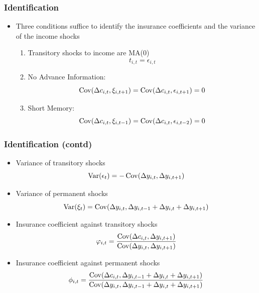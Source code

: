 \begin{frame}
	\frametitle{Identification}
	\begin{itemize}
		\item Three conditions suffice to identify the insurance coefficients and the variance of the income shocks
		\begin{enumerate}
			\item Transitory shocks to income are MA(0)
				\begin{equation}
					t_{i,t} = \epsilon_{i,t} \nonumber
				\end{equation}
			\item No Advance Information: 
				\begin{equation}
\operatorname{Cov}(\Delta c_{i,t}, \xi_{i,t+1}) = \operatorname{Cov}(\Delta c_{i,t}, \epsilon_{i,t+1}) = 0 \nonumber
				\end{equation}
			\item Short Memory: 
				\begin{equation}
\operatorname{Cov}(\Delta c_{i,t}, \xi_{i,t-1}) = \operatorname{Cov}(\Delta c_{i,t}, \epsilon_{i,t-2}) = 0 \nonumber
				\end{equation}
		\end{enumerate}
	\end{itemize}
\end{frame}

\begin{frame}
	\frametitle{Identification (contd)}
		\begin{itemize}
			\item Variance of transitory shocks
				\begin{equation}
					\operatorname{Var}(\epsilon_{t}) = -\operatorname{Cov}(\Delta y_{i,t}, \Delta y_{i,t+1}) \nonumber
				\end{equation}
			\item Variance of permanent shocks
				\begin{equation}
					\operatorname{Var}(\xi_{t} ) = \operatorname{Cov}(\Delta y_{i,t}, \Delta y_{i,t-1} + \Delta y_{i,t} + \Delta y_{i,t+1}) \nonumber
				\end{equation}
			\item Insurance coefficient against transitory shocks
				\begin{equation}
					\varphi_{i,t} = \frac{\operatorname{Cov}(\Delta c_{i,t}, \Delta y_{i,t+1})}{\operatorname{Cov}(\Delta y_{i,t}, \Delta y_{i,t+1})} \nonumber
				\end{equation}
			\item Insurance coefficient against permanent shocks
				\begin{equation}
					\phi_{i,t} = \frac{\operatorname{Cov}(\Delta c_{i,t}, \Delta y_{i,t-1} + \Delta y_{i,t} + \Delta y_{i,t+1})}{\operatorname{Cov}(\Delta y_{i,t}, \Delta y_{i,t-1} + \Delta y_{i,t} + \Delta y_{i,t+1})} \nonumber
				\end{equation}
		\end{itemize}
\end{frame}

